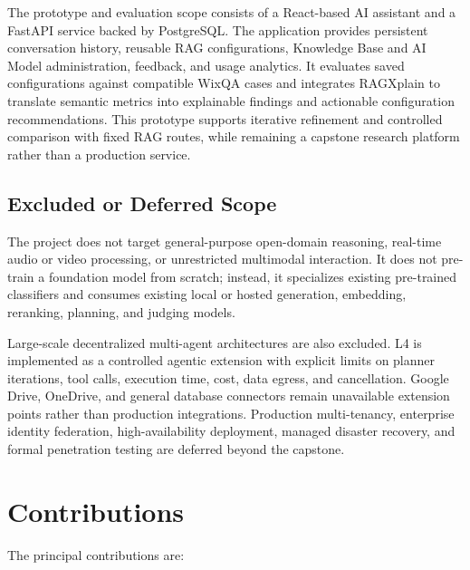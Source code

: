 The prototype and evaluation scope consists of a React-based AI assistant and
a FastAPI service backed by PostgreSQL. The application provides persistent
conversation history, reusable RAG configurations, Knowledge Base and AI Model
administration, feedback, and usage analytics. It evaluates saved
configurations against compatible WixQA cases and integrates RAGXplain to
translate semantic metrics into explainable findings and actionable
configuration recommendations. This prototype supports iterative refinement
and controlled comparison with fixed RAG routes, while remaining a capstone
research platform rather than a production service.

\subsection{Excluded or Deferred Scope}

The project does not target general-purpose open-domain reasoning, real-time
audio or video processing, or unrestricted multimodal interaction. It does not
pre-train a foundation model from scratch; instead, it specializes existing
pre-trained classifiers and consumes existing local or hosted generation,
embedding, reranking, planning, and judging models.

Large-scale decentralized multi-agent architectures are also excluded. L4 is
implemented as a controlled agentic extension with explicit limits on planner
iterations, tool calls, execution time, cost, data egress, and cancellation.
Google Drive, OneDrive, and general database connectors remain unavailable
extension points rather than production integrations. Production
multi-tenancy, enterprise identity federation, high-availability deployment,
managed disaster recovery, and formal penetration testing are deferred beyond
the capstone.

\section{Contributions}

The principal contributions are:

